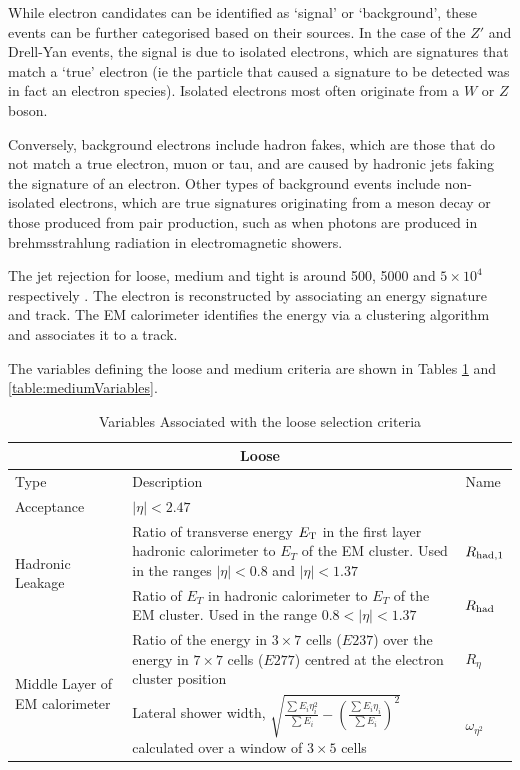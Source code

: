 \documentclass{article}
\begin{document}
While electron candidates can be identified as `signal' or `background', these events can be further categorised based on their sources. In the case of the $Z'$ and Drell-Yan events, the signal is due to isolated electrons, which are signatures that match a `true' electron (ie the particle that caused a signature to be detected was in fact an electron species). Isolated electrons most often originate from a $W$ or $Z$ boson.

Conversely, background electrons include hadron fakes, which are those that do not match a true electron, muon or tau, and are caused by hadronic jets faking the signature of an electron. Other types of background events include non-isolated electrons, which are true signatures originating from a meson decay or those produced from pair production, such as when photons are produced in brehmsstrahlung radiation in electromagnetic showers.

The jet rejection for loose, medium and tight is around 500, 5000 and $5\times10^4$  respectively \cite{ElectronPerformanceMeasurements}. The electron is reconstructed by associating an energy signature and track. The EM calorimeter identifies the energy via a clustering algorithm and associates it to a track. 

The variables defining the loose and medium criteria are shown in Tables \ref{table:looseVariables} and \ref{table:mediumVariables}.

\begin{table}[h!t]
\caption{ Variables Associated with the loose selection criteria \cite{ElectronPerformanceMeasurements}\label{table:looseVariables}}
\begin{tabular}{|p{5cm}|p{8cm}|p{1cm}| } 
\hline
\multicolumn{3}{|c|}{\textbf{Loose}}		\\\hline
Type&Description&Name		    \\\hline
Acceptance &  $|\eta|<2.47$ &  	\\\hline
\multirow{2}{*}{Hadronic Leakage} & Ratio of transverse energy $E_{\rm{T}}$ in the first layer hadronic calorimeter to $E_T$ of the EM cluster. Used in the ranges $|\eta|<0.8$ and $|\eta|<1.37$ & $R_{\rm{had,1}}$ \\\cline{2-3}
& Ratio of $E_T$ in hadronic calorimeter to $E_T$ of the EM cluster. Used in the range $0.8<|\eta|<1.37$ & $R_{\rm{had}}$\\\hline
\multirow{2}{*}{Middle Layer of EM calorimeter} & Ratio of the energy in $3\times7$ cells ($E237$) over the energy in $7\times7$ cells ($E277$) centred at the electron cluster position & $R_{\eta}$ \\\cline{2-3}
& Lateral shower width, $ \sqrt{\frac{\sum E_i \eta_{i}^{2}}{\sum E_i} - \left( \frac{\sum E_i \eta_i}{\sum E_i} \right)^2 }$ calculated over a window of $3\times5$ cells & $\omega_{\eta^2}$ \\\hline
\end{tabular}
\end{table}
\end{document}
